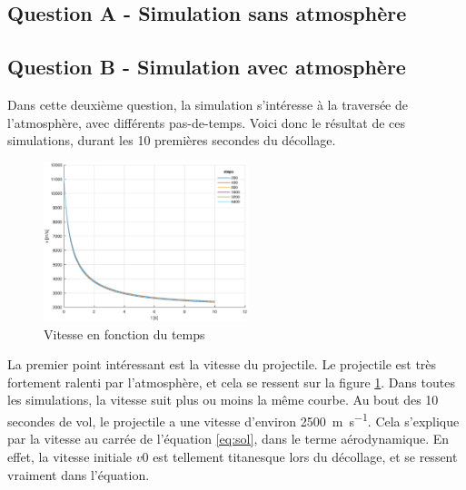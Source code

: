 \documentclass[a4paper,12pt,twoside]{article}
\begin{document}
\subsection{Question A - Simulation sans atmosphère}

\subsection{Question B - Simulation avec atmosphère}
Dans cette deuxième question, la simulation s'intéresse à la traversée de l'atmosphère, avec différents pas-de-temps. Voici donc le résultat de ces simulations, durant les 10 premières secondes du décollage.\\

\begin{figure}
	\vspace{-20pt}
    \includegraphics[width=0.53\textwidth]{graphs/vB.eps}
    \vspace{-15pt}
    \caption{Vitesse en fonction du temps}
    \vspace{-10pt}
    \label{fig:B-vt}
\end{figure}

La premier point intéressant est la vitesse du projectile. Le projectile est très fortement ralenti par l'atmosphère, et cela se ressent sur la figure \ref{fig:B-vt}. Dans toutes les simulations, la vitesse suit plus ou moins la même courbe. Au bout des 10 secondes de vol, le projectile a une vitesse d'environ \SI{2500}{\meter\per\second}. Cela s'explique par la vitesse au carrée de l'équation \ref{eq:sol}, dans le terme aérodynamique. En effet, la vitesse initiale $v0$ est tellement titanesque lors du décollage, et se ressent vraiment dans l'équation.\\
\end{document}
